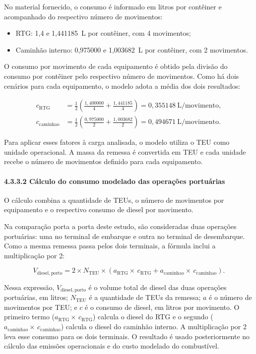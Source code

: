 \documentclass[brazil,]{article}
\let\oldparagraph\paragraph
\renewcommand{\paragraph}[1]{\Needspace{7\baselineskip}\oldparagraph{#1}\mbox{}}
\begin{document}
No material fornecido, o consumo é informado em litros por contêiner e
acompanhado do respectivo número de movimentos:

\begin{itemize}
\item
  RTG: 1,4 e 1,441185~L por contêiner, com 4 movimentos;
\item
  Caminhão interno: 0,975000 e 1,003682~L por contêiner, com 2
  movimentos.
\end{itemize}

O consumo por movimento de cada equipamento é obtido pela divisão do
consumo por contêiner pelo respectivo número de movimentos. Como há dois
cenários para cada equipamento, o modelo adota a média dos dois
resultados:

\[
\begin{aligned}
c_{\mathrm{RTG}}
&=\frac{1}{2}\left(\frac{1{,}400000}{4}+\frac{1{,}441185}{4}\right)
=0{,}355148\ \mathrm{L/movimento},\\
c_{\mathrm{caminhao}}
&=\frac{1}{2}\left(\frac{0{,}975000}{2}+\frac{1{,}003682}{2}\right)
=0{,}494671\ \mathrm{L/movimento}.
\end{aligned}
\]

Para aplicar esses fatores à carga analisada, o modelo utiliza o TEU como
unidade operacional. A massa da remessa é convertida em TEU e cada
unidade recebe o número de movimentos definido para cada equipamento.

\hypertarget{calculo-do-consumo-modelado-das-operacoes-portuarias}{%
\paragraph{4.3.3.2 Cálculo do consumo modelado das operações
portuárias}\label{calculo-do-consumo-modelado-das-operacoes-portuarias}}

O cálculo combina a quantidade de TEUs, o número de movimentos por
equipamento e o respectivo consumo de diesel por movimento.

Na comparação porta a porta deste estudo, são consideradas duas operações
portuárias: uma no terminal de embarque e outra no terminal de
desembarque. Como a mesma remessa passa pelos dois terminais, a fórmula
inclui a multiplicação por 2:

\[
V_{\mathrm{diesel,porto}}
=2\times N_{\mathrm{TEU}}\times
\left(a_{\mathrm{RTG}}\times\,c_{\mathrm{RTG}}
+a_{\mathrm{caminhao}}\times\,c_{\mathrm{caminhao}}\right).
\]

Nessa expressão, \(V_{\mathrm{diesel,porto}}\) é o volume total de
diesel das duas operações portuárias, em litros; \(N_{\mathrm{TEU}}\) é
a quantidade de TEUs da remessa; \(a\) é o número de movimentos por TEU;
e \(c\) é o consumo de diesel, em litros por movimento. O primeiro termo
(\(a_{\mathrm{RTG}}\times\,c_{\mathrm{RTG}}\)) calcula o diesel do RTG e
o segundo (\(a_{\mathrm{caminhao}}\times\,c_{\mathrm{caminhao}}\))
calcula o diesel do caminhão interno. A multiplicação por 2 leva esse
consumo para os dois terminais. O resultado é usado posteriormente no
cálculo das emissões operacionais e do custo modelado do combustível.
\end{document}
